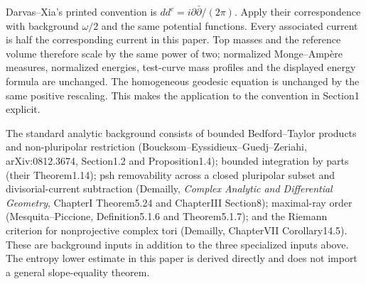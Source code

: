 \documentclass[
]{article}
\begin{document}
Darvas--Xia's printed convention is
\(dd^c=i\partial\bar\partial/(2\pi)\). Apply their correspondence with
background \(\omega/2\) and the same potential functions. Every
associated current is half the corresponding current in this paper. Top
masses and the reference volume therefore scale by the same power of
two; normalized Monge--Ampère measures, normalized energies, test-curve
mass profiles and the displayed energy formula are unchanged. The
homogeneous geodesic equation is unchanged by the same positive
rescaling. This makes the application to the convention in Section1
explicit.

The standard analytic background consists of bounded Bedford--Taylor
products and non-pluripolar restriction
(Boucksom--Eyssidieux--Guedj--Zeriahi, arXiv:0812.3674, Section1.2 and
Proposition1.4); bounded integration by parts (their Theorem1.14); psh
removability across a closed pluripolar subset and divisorial-current
subtraction (Demailly, \emph{Complex Analytic and Differential
Geometry}, ChapterI Theorem5.24 and ChapterIII Section8); maximal-ray
order (Mesquita--Piccione, Definition5.1.6 and Theorem5.1.7); and the
Riemann criterion for nonprojective complex tori (Demailly, ChapterVII
Corollary14.5). These are background inputs in addition to the three
specialized inputs above. The entropy lower estimate in this paper is
derived directly and does not import a general slope-equality theorem.
\end{document}
